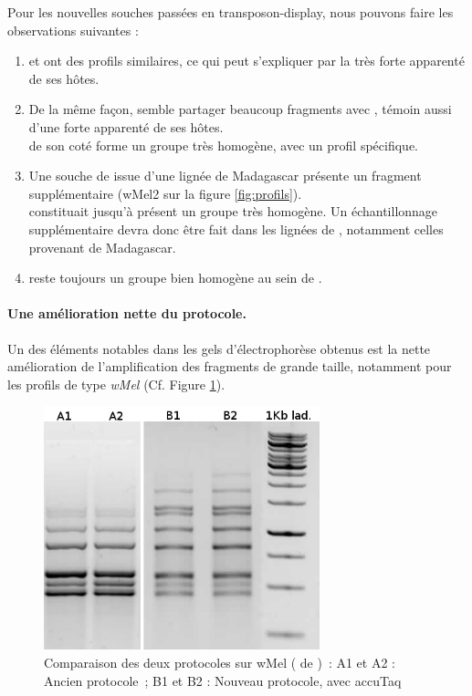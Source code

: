 Pour les nouvelles souches passées en transposon-display, nous pouvons faire les observations suivantes : 
\begin{enumerate}
	\item {} et  ont des profils similaires, ce qui peut s'expliquer par la très forte apparenté de ses hôtes.
	\item De la même façon,  semble partager beaucoup fragments avec , témoin aussi d'une forte apparenté de ses hôtes.\\
	 de son coté forme un groupe très homogène, avec un profil spécifique.
	\item Une souche de  issue d'une lignée de Madagascar présente un fragment supplémentaire (wMel2 sur la figure \ref{fig:profils}).\\
	 constituait jusqu'à présent un groupe très homogène.
	Un échantillonnage supplémentaire devra donc être fait dans les lignées de , notamment celles provenant de Madagascar.
	\item {} reste toujours un groupe bien homogène au sein de .
\end{enumerate}



\paragraph{Une amélioration nette du protocole.} %
\label{par:proto}
Un des éléments notables dans les gels d'électrophorèse obtenus est la nette amélioration de l'amplification des fragments de grande taille, notamment pour les profils de type \textit{wMel} (Cf. Figure \ref{fig:wMelcomp}). 

\begin{figure}[h]
	\begin{center}
		\includegraphics[width=80mm]{images/wMel_comp.png}
	\end{center}
	\caption{Comparaison des deux protocoles sur wMel ( de )~:
	A1 et A2 : Ancien protocole\cite{memHH}~;
	B1 et B2 : Nouveau protocole, avec accuTaq}
	\label{fig:wMelcomp}
\end{figure}

